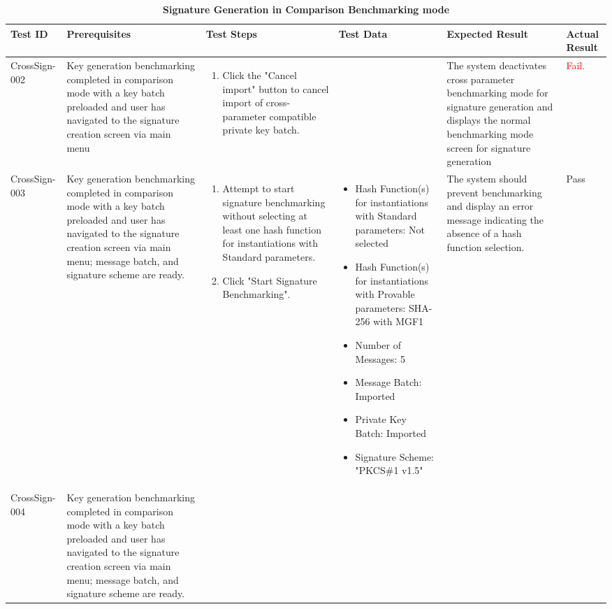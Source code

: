 \documentclass[]{final_report}
\theoremstyle{definition}
\begin{document}
\begin{longtable}{|p{1.5cm}|p{2.5cm}|p{3.5cm}|p{2.5cm}|p{3cm}|p{2cm}|}
  \caption{\textbf{Signature Generation in Comparison Benchmarking mode}} \\
  \hline
  \textbf{Test ID} & \textbf{Prerequisites} & \textbf{Test Steps} & \textbf{Test Data} & \textbf{Expected Result} & \textbf{Actual Result} \\
  \hline
  CrossSign-002 & Key generation benchmarking completed in comparison mode with a key batch preloaded and user has navigated to the signature creation screen via main menu & 
  \begin{enumerate}
    \item Click the "Cancel import" button to cancel import of cross-parameter compatible private key batch.
  \end{enumerate} &  & The system deactivates cross parameter benchmarking mode for signature generation and displays the normal benchmarking mode screen for signature generation &  \textcolor{red}{Fail.} \\
  \hline
  CrossSign-003 & Key generation benchmarking completed in comparison mode with a key batch preloaded and user has navigated to the signature creation screen via main menu; message batch, and signature scheme are ready. &
  \begin{enumerate}
    \item Attempt to start signature benchmarking without selecting at least one hash function for instantiations with Standard parameters.
    \item Click "Start Signature Benchmarking".
  \end{enumerate} & 
  \begin{itemize}
    \item Hash Function(s) for instantiations with Standard parameters: Not selected
     \item Hash Function(s) for instantiations with Provable parameters: SHA-256 with MGF1
    \item Number of Messages: 5
    \item Message Batch: Imported
    \item Private Key Batch: Imported
    \item Signature Scheme: "PKCS\#1 v1.5" 
  \end{itemize} &
  The system should prevent benchmarking and display an error message indicating the absence of a hash function selection. & Pass \\
    \hline
  CrossSign-004 & Key generation benchmarking completed in comparison mode with a key batch preloaded and user has navigated to the signature creation screen via main menu; message batch, and signature scheme are ready. &

\end{longtable}
\end{document}
